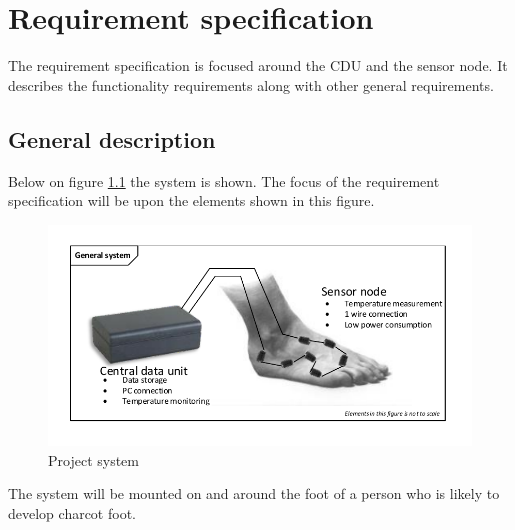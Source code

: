 \chapter{Requirement specification}

The requirement specification is focused around the CDU and the sensor node. It describes the functionality requirements along with other general requirements.

\section{General description}
Below on figure \ref{fig:project_system} the system is shown. The focus of the requirement specification will be upon the elements shown in this figure.

\begin{figure}[H]
	\centering
	\includegraphics[width=.9\textwidth]{billeder/7requirementspec/GeneralSystem}
	\caption{Project system}
	\label{fig:project_system}
\end{figure}

The system will be mounted on and around the foot of a person who is likely to develop charcot foot. 


